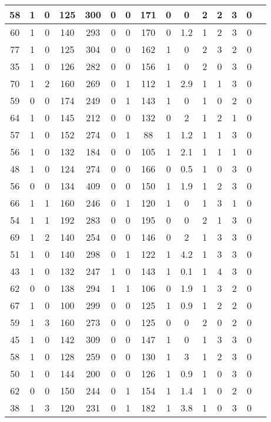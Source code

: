 \documentclass{article}
\begin{document}
\begin{longtable}{
|
c|c|c|c|c|c|c|c|c|c|c|c|c|c|c|}
\hline
58 & 1 & 0 & 125 & 300 & 0 & 0 & 171 & 0 & 0 & 2 & 2 & 3 & 0 \\
\hline
60 & 1 & 0 & 140 & 293 & 0 & 0 & 170 & 0 & 1.2 & 1 & 2 & 3 & 0 \\
\hline
77 & 1 & 0 & 125 & 304 & 0 & 0 & 162 & 1 & 0 & 2 & 3 & 2 & 0 \\
\hline
35 & 1 & 0 & 126 & 282 & 0 & 0 & 156 & 1 & 0 & 2 & 0 & 3 & 0 \\
\hline
70 & 1 & 2 & 160 & 269 & 0 & 1 & 112 & 1 & 2.9 & 1 & 1 & 3 & 0 \\
\hline
59 & 0 & 0 & 174 & 249 & 0 & 1 & 143 & 1 & 0 & 1 & 0 & 2 & 0 \\
\hline
64 & 1 & 0 & 145 & 212 & 0 & 0 & 132 & 0 & 2 & 1 & 2 & 1 & 0 \\
\hline
57 & 1 & 0 & 152 & 274 & 0 & 1 & 88 & 1 & 1.2 & 1 & 1 & 3 & 0 \\
\hline
56 & 1 & 0 & 132 & 184 & 0 & 0 & 105 & 1 & 2.1 & 1 & 1 & 1 & 0 \\
\hline
48 & 1 & 0 & 124 & 274 & 0 & 0 & 166 & 0 & 0.5 & 1 & 0 & 3 & 0 \\
\hline
56 & 0 & 0 & 134 & 409 & 0 & 0 & 150 & 1 & 1.9 & 1 & 2 & 3 & 0 \\
\hline
66 & 1 & 1 & 160 & 246 & 0 & 1 & 120 & 1 & 0 & 1 & 3 & 1 & 0 \\
\hline
54 & 1 & 1 & 192 & 283 & 0 & 0 & 195 & 0 & 0 & 2 & 1 & 3 & 0 \\
\hline
69 & 1 & 2 & 140 & 254 & 0 & 0 & 146 & 0 & 2 & 1 & 3 & 3 & 0 \\
\hline
51 & 1 & 0 & 140 & 298 & 0 & 1 & 122 & 1 & 4.2 & 1 & 3 & 3 & 0 \\
\hline
43 & 1 & 0 & 132 & 247 & 1 & 0 & 143 & 1 & 0.1 & 1 & 4 & 3 & 0 \\
\hline
62 & 0 & 0 & 138 & 294 & 1 & 1 & 106 & 0 & 1.9 & 1 & 3 & 2 & 0 \\
\hline
67 & 1 & 0 & 100 & 299 & 0 & 0 & 125 & 1 & 0.9 & 1 & 2 & 2 & 0 \\
\hline
59 & 1 & 3 & 160 & 273 & 0 & 0 & 125 & 0 & 0 & 2 & 0 & 2 & 0 \\
\hline
45 & 1 & 0 & 142 & 309 & 0 & 0 & 147 & 1 & 0 & 1 & 3 & 3 & 0 \\
\hline
58 & 1 & 0 & 128 & 259 & 0 & 0 & 130 & 1 & 3 & 1 & 2 & 3 & 0 \\
\hline
50 & 1 & 0 & 144 & 200 & 0 & 0 & 126 & 1 & 0.9 & 1 & 0 & 3 & 0 \\
\hline
62 & 0 & 0 & 150 & 244 & 0 & 1 & 154 & 1 & 1.4 & 1 & 0 & 2 & 0 \\
\hline
38 & 1 & 3 & 120 & 231 & 0 & 1 & 182 & 1 & 3.8 & 1 & 0 & 3 & 0 \\

\end{longtable}
\end{document}
